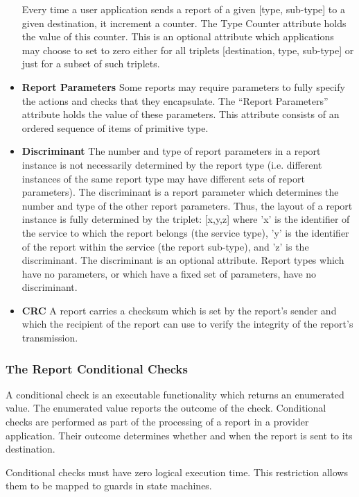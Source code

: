 \begin{itemize}
Every time a user application sends a report of a given [type, sub-type] to a given destination, it increment a counter. The Type Counter attribute holds the value of this counter. This is an optional attribute which applications may choose to set to zero either for all triplets [destination, type, sub-type] or just for a subset of such triplets.
\item \textbf{Report Parameters}
Some reports may require parameters to fully specify the actions and checks that they encapsulate. The “Report Parameters” attribute holds the value of these parameters. This attribute consists of an ordered sequence of items of primitive type. 
\item \textbf{Discriminant}
The number and type of report parameters in a report instance is not necessarily determined by the report type (i.e. different instances of the same report type may have different sets of report parameters). The discriminant is a report parameter which determines the number and type of the other report parameters. Thus, the layout of a report instance is fully determined by the triplet: [x,y,z] where 'x' is the identifier of the service to which the report belongs (the service type), 'y' is the identifier of the report within the service (the report sub-type), and 'z' is the discriminant.  The discriminant is an optional attribute. Report types which have no parameters, or which have a fixed set of parameters, have no discriminant.
\item \textbf{CRC}
A report carries a checksum which is set by the report's sender and which the recipient of the report can use to verify the integrity of the report's transmission. 

\end{itemize}


\subsubsection{The Report Conditional Checks}\label{sec:RepConditionalChecks}

A conditional check is an executable functionality which returns an enumerated value. The enumerated value reports the outcome of the check. Conditional checks are performed as part of the processing of a report in a provider application. Their outcome determines whether and when the report is sent to its destination. 

Conditional checks must have zero logical execution time. This restriction allows them to be mapped to guards in state machines. 

